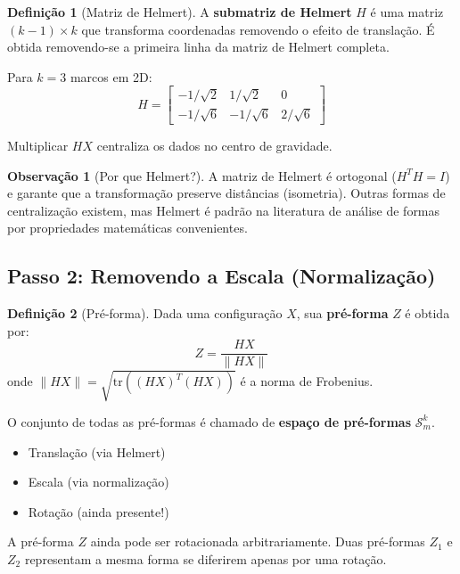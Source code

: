 \documentclass[12pt,a4paper]{article}
\theoremstyle{definition}
\newtheorem{definicao}{Definição}[section]
\newtheorem{observacao}{Observação}[section]
\begin{document}
\begin{definicao}[Matriz de Helmert]
A \textbf{submatriz de Helmert} $H$ é uma matriz $(k-1) \times k$ que transforma coordenadas removendo o efeito de translação. É obtida removendo-se a primeira linha da matriz de Helmert completa.

Para $k=3$ marcos em 2D:
\[
H = \begin{bmatrix}
-1/\sqrt{2} & 1/\sqrt{2} & 0 \\
-1/\sqrt{6} & -1/\sqrt{6} & 2/\sqrt{6}
\end{bmatrix}
\]

Multiplicar $HX$ centraliza os dados no centro de gravidade.
\end{definicao}

\begin{observacao}[Por que Helmert?]
A matriz de Helmert é ortogonal ($H^TH = I$) e garante que a transformação preserve distâncias (isometria). Outras formas de centralização existem, mas Helmert é padrão na literatura de análise de formas por propriedades matemáticas convenientes.
\end{observacao}

\subsection{Passo 2: Removendo a Escala (Normalização)}

\begin{definicao}[Pré-forma]
Dada uma configuração $X$, sua \textbf{pré-forma} $Z$ é obtida por:
\begin{equation}
Z = \frac{HX}{\|HX\|}
\end{equation}
onde $\|HX\| = \sqrt{\text{tr}((HX)^T(HX))}$ é a norma de Frobenius.

O conjunto de todas as pré-formas é chamado de \textbf{espaço de pré-formas} $\mathcal{S}_m^k$.
\end{definicao}

\begin{tcolorbox}[caixaimportante={O que foi removido até agora?}]
\begin{itemize}
    \item[$\checkmark$] Translação (via Helmert)
    \item[$\checkmark$] Escala (via normalização)
    \item[$\times$] Rotação (ainda presente!)
\end{itemize}
A pré-forma $Z$ ainda pode ser rotacionada arbitrariamente. Duas pré-formas $Z_1$ e $Z_2$ representam a mesma forma se diferirem apenas por uma rotação.
\end{tcolorbox}
\end{document}
